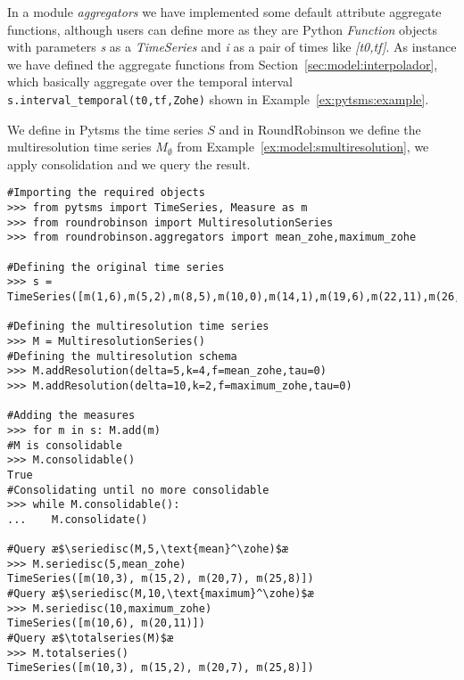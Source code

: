 In a module \emph{aggregators} we have implemented some default
attribute aggregate functions, although users can define more as they
are Python \emph{Function} objects with parameters \emph{s} as a
\emph{TimeSeries} and \emph{i} as a pair of times like
\emph{[t0,tf]}. As instance we have defined the \zohe{} aggregate
functions from Section~\ref{sec:model:interpolador}, which basically
aggregate over the temporal interval
\lstinline[style=py]+s.interval_temporal(t0,tf,Zohe)+ shown in
Example~\ref{ex:pytsms:example}.


\begin{example}
  We define in Pytsms the time series $S$ and in RoundRobinson we
  define the multiresolution time series $M_\emptyset$ from
  Example~\ref{ex:model:smultiresolution}, we apply consolidation and
  we query the result.

\begin{lstlisting}[style=py]
#Importing the required objects
>>> from pytsms import TimeSeries, Measure as m
>>> from roundrobinson import MultiresolutionSeries
>>> from roundrobinson.aggregators import mean_zohe,maximum_zohe

#Defining the original time series
>>> s = TimeSeries([m(1,6),m(5,2),m(8,5),m(10,0),m(14,1),m(19,6),m(22,11),m(26,6),m(29,0)])

#Defining the multiresolution time series
>>> M = MultiresolutionSeries()
#Defining the multiresolution schema
>>> M.addResolution(delta=5,k=4,f=mean_zohe,tau=0)
>>> M.addResolution(delta=10,k=2,f=maximum_zohe,tau=0)

#Adding the measures
>>> for m in s: M.add(m)
#M is consolidable
>>> M.consolidable()
True
#Consolidating until no more consolidable
>>> while M.consolidable():
...    M.consolidate()

#Query æ$\seriedisc(M,5,\text{mean}^\zohe)$æ
>>> M.seriedisc(5,mean_zohe)
TimeSeries([m(10,3), m(15,2), m(20,7), m(25,8)])
#Query æ$\seriedisc(M,10,\text{maximum}^\zohe)$æ
>>> M.seriedisc(10,maximum_zohe)
TimeSeries([m(10,6), m(20,11)])
#Query æ$\totalseries(M)$æ
>>> M.totalseries()
TimeSeries([m(10,3), m(15,2), m(20,7), m(25,8)])
\end{lstlisting}
\end{example}



